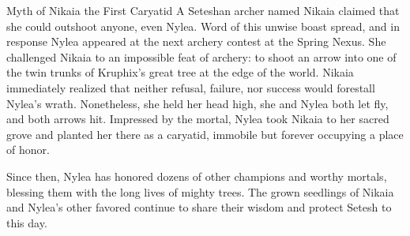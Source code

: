 \begin{DndComment}[float=b]{Myth of Nikaia the First Caryatid}
    A Seteshan archer named Nikaia claimed that she could outshoot anyone, even Nylea.
    Word of this unwise boast spread, and in response Nylea appeared at the next archery contest at the Spring Nexus.
    She challenged Nikaia to an impossible feat of archery: to shoot an arrow into one of the twin trunks of Kruphix's great tree at the edge of the world.
    Nikaia immediately realized that neither refusal, failure, nor success would forestall Nylea's wrath.
    Nonetheless, she held her head high, she and Nylea both let fly, and both arrows hit.
    Impressed by the mortal, Nylea took Nikaia to her sacred grove and planted her there as a caryatid, immobile but forever occupying a place of honor.

    Since then, Nylea has honored dozens of other champions and worthy mortals, blessing them with the long lives of mighty trees.
    The grown seedlings of Nikaia and Nylea's other favored continue to share their wisdom and protect Setesh to this day.
\end{DndComment}
